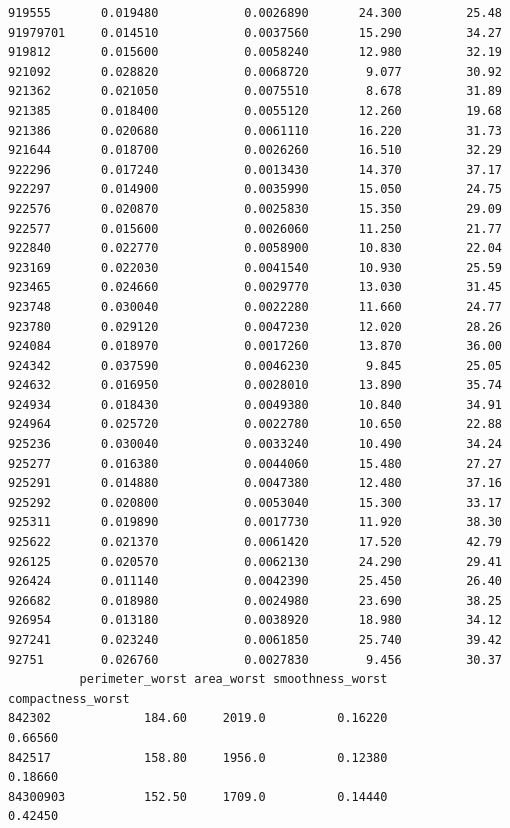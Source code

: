 \documentclass[
  letterpaper,
  DIV=11,
  numbers=noendperiod]{scrartcl}
\begin{document}
\begin{verbatim}
919555       0.019480            0.0026890       24.300         25.48
91979701     0.014510            0.0037560       15.290         34.27
919812       0.015600            0.0058240       12.980         32.19
921092       0.028820            0.0068720        9.077         30.92
921362       0.021050            0.0075510        8.678         31.89
921385       0.018400            0.0055120       12.260         19.68
921386       0.020680            0.0061110       16.220         31.73
921644       0.018700            0.0026260       16.510         32.29
922296       0.017240            0.0013430       14.370         37.17
922297       0.014900            0.0035990       15.050         24.75
922576       0.020870            0.0025830       15.350         29.09
922577       0.015600            0.0026060       11.250         21.77
922840       0.022770            0.0058900       10.830         22.04
923169       0.022030            0.0041540       10.930         25.59
923465       0.024660            0.0029770       13.030         31.45
923748       0.030040            0.0022280       11.660         24.77
923780       0.029120            0.0047230       12.020         28.26
924084       0.018970            0.0017260       13.870         36.00
924342       0.037590            0.0046230        9.845         25.05
924632       0.016950            0.0028010       13.890         35.74
924934       0.018430            0.0049380       10.840         34.91
924964       0.025720            0.0022780       10.650         22.88
925236       0.030040            0.0033240       10.490         34.24
925277       0.016380            0.0044060       15.480         27.27
925291       0.014880            0.0047380       12.480         37.16
925292       0.020800            0.0053040       15.300         33.17
925311       0.019890            0.0017730       11.920         38.30
925622       0.021370            0.0061420       17.520         42.79
926125       0.020570            0.0062130       24.290         29.41
926424       0.011140            0.0042390       25.450         26.40
926682       0.018980            0.0024980       23.690         38.25
926954       0.013180            0.0038920       18.980         34.12
927241       0.023240            0.0061850       25.740         39.42
92751        0.026760            0.0027830        9.456         30.37
          perimeter_worst area_worst smoothness_worst compactness_worst
842302             184.60     2019.0          0.16220           0.66560
842517             158.80     1956.0          0.12380           0.18660
84300903           152.50     1709.0          0.14440           0.42450

\end{verbatim}
\end{document}
